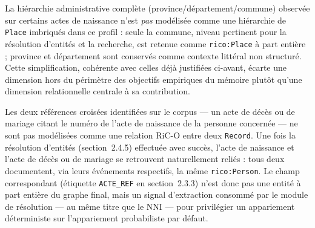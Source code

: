 La hiérarchie administrative complète (province/département/commune) observée sur certains actes de naissance n'est \emph{pas} modélisée comme une hiérarchie de \texttt{Place} imbriqués dans ce profil : seule la commune, niveau pertinent pour la résolution d'entités et la recherche, est retenue comme \texttt{rico:Place} à part entière ; province et département sont conservés comme contexte littéral non structuré.
Cette simplification, cohérente avec celles déjà justifiées ci-avant, écarte une dimension hors du périmètre des objectifs empiriques du mémoire plutôt qu'une dimension relationnelle centrale à sa contribution.

Les deux références croisées identifiées sur le corpus --- un acte de décès ou de mariage citant le numéro de l'acte de naissance de la personne concernée --- ne sont pas modélisées comme une relation RiC-O entre deux \texttt{Record}.
Une fois la résolution d'entités (section~2.4.5) effectuée avec succès, l'acte de naissance et l'acte de décès ou de mariage se retrouvent naturellement reliés : tous deux documentent, via leurs événements respectifs, la même \texttt{rico:Person}.
Le champ correspondant (étiquette \texttt{ACTE\_REF} en section~2.3.3) n'est donc pas une entité à part entière du graphe final, mais un signal d'extraction consommé par le module de résolution --- au même titre que le NNI --- pour privilégier un appariement déterministe sur l'appariement probabiliste par défaut.



